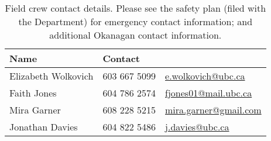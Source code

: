 \documentclass[11pt,letter]{article}
\begin{document}
\begin{table}[h!]
\caption{Field crew contact details. Please see the safety plan (filed with the Department) for emergency contact information; and additional Okanagan contact information. } %
\begin{tabular}{ l | l | l }  %
\hline\hline %
Name & Contact\\ [0.5ex] %
\hline %
Elizabeth Wolkovich & 603 667 5099 & \url{e.wolkovich@ubc.ca}  \\ %
Faith Jones & 604 786 2574 &\url{fjones01@mail.ubc.ca}\\
Mira Garner & 608 228 5215 & \url{mira.garner@gmail.com}\\
Jonathan Davies & 604 822 5486 & \url{j.davies@ubc.ca} \\ 
\hline %
\end{tabular}
\label{table:nonlin} %
\end{table}
\end{document}
